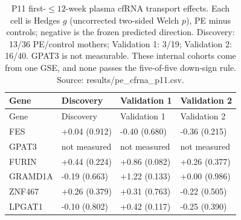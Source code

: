 \begin{longtable}{lp{3.0cm}p{3.0cm}p{3.0cm}}
\caption{P11 first-$\leq12$-week plasma cfRNA transport effects. Each cell is Hedges $g$ (uncorrected two-sided Welch $p$), PE minus controls; negative is the frozen predicted direction. Discovery: 13/36 PE/control mothers; Validation 1: 3/19; Validation 2: 16/40. GPAT3 is not measurable. These internal cohorts come from one GSE, and none passes the five-of-five down-sign rule. Source: results/pe\_cfrna\_p11.csv.}\\
\hline Gene & Discovery & Validation 1 & Validation 2\\\hline\endfirsthead
\hline Gene & Discovery & Validation 1 & Validation 2\\\hline\endhead
FES & +0.04 (0.912) & -0.40 (0.680) & -0.36 (0.215)\\
GPAT3 & not measured & not measured & not measured\\
FURIN & +0.44 (0.224) & +0.86 (0.082) & +0.26 (0.377)\\
GRAMD1A & -0.19 (0.663) & +1.22 (0.133) & +0.00 (0.986)\\
ZNF467 & +0.26 (0.379) & +0.31 (0.763) & -0.22 (0.505)\\
LPGAT1 & -0.10 (0.802) & +0.42 (0.117) & -0.25 (0.390)\\
\hline\end{longtable}
